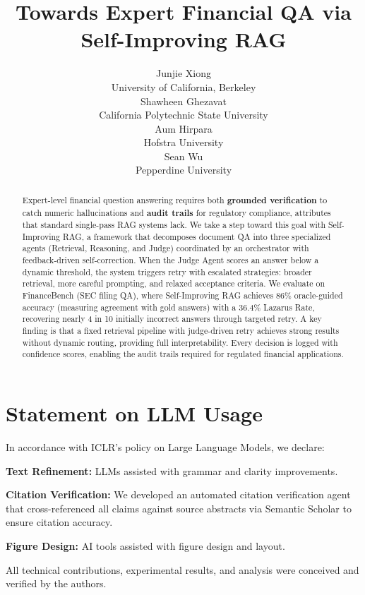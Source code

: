 \documentclass{article}
\title{Towards Expert Financial QA via Self-Improving RAG}
\author{
  Junjie Xiong \\
  University of California, Berkeley \\
  \And
  Shawheen Ghezavat \\
  California Polytechnic State University \\
  \And
  Aum Hirpara \\
  Hofstra University \\
  \And
  Sean Wu \\
  Pepperdine University
}
\begin{document}
\raggedbottom  %

\maketitle

\begin{abstract}
Expert-level financial question answering requires both \textbf{grounded verification} to catch numeric hallucinations and \textbf{audit trails} for regulatory compliance, attributes that standard single-pass RAG systems lack. We take a step toward this goal with Self-Improving RAG, a framework that decomposes document QA into three specialized agents (Retrieval, Reasoning, and Judge) coordinated by an orchestrator with feedback-driven self-correction. When the Judge Agent scores an answer below a dynamic threshold, the system triggers retry with escalated strategies: broader retrieval, more careful prompting, and relaxed acceptance criteria. We evaluate on FinanceBench (SEC filing QA), where Self-Improving RAG achieves 86\% oracle-guided accuracy (measuring agreement with gold answers) with a 36.4\% Lazarus Rate, recovering nearly 4 in 10 initially incorrect answers through targeted retry. A key finding is that a fixed retrieval pipeline with judge-driven retry achieves strong results without dynamic routing, providing full interpretability. Every decision is logged with confidence scores, enabling the audit trails required for regulated financial applications.
\end{abstract}










\appendix


\section*{Statement on LLM Usage}

In accordance with ICLR's policy on Large Language Models, we declare:

\textbf{Text Refinement:} LLMs assisted with grammar and clarity improvements.

\textbf{Citation Verification:} We developed an automated citation verification
agent that cross-referenced all claims against source abstracts via Semantic
Scholar to ensure citation accuracy.

\textbf{Figure Design:} AI tools assisted with figure design and layout.

All technical contributions, experimental results, and analysis were conceived
and verified by the authors.
\end{document}

